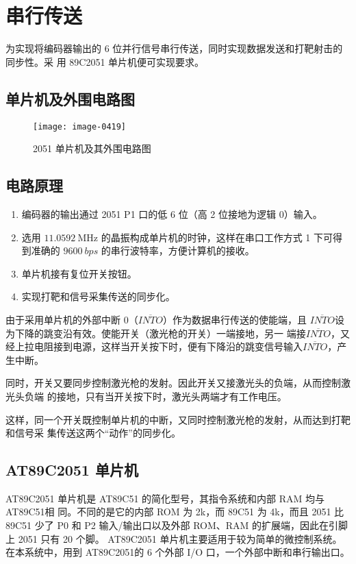 \section{串行传送}

为实现将编码器输出的 6 位并行信号串行传送，同时实现数据发送和打靶射击的同步性。采
用 89C2051 单片机便可实现要求。

\subsection{单片机及外围电路图}

\begin{figure}[htbp]
  \centering
  \texttt{[image: image-0419]}
  \caption{2051 单片机及其外围电路图}\label{4-8}
\end{figure}

\subsection{电路原理}

\begin{enumerate}
  \item 编码器的输出通过 2051 P1 口的低 6 位（高 2 位接地为逻辑 0）输入。
  \item 选用 $\qty{11.0592}\MHz$ 的晶振构成单片机的时钟，这样在串口工作方式 1 下可得到准确的 $\qty{9600}{bps}$ 的串行波特率，方便计算机的接收。
  \item 单片机接有复位开关按钮。
  \item 实现打靶和信号采集传送的同步化。
\end{enumerate}

由于采用单片机的外部中断 0（$\overline{INTO}$）作为数据串行传送的使能端，且
$\overline{INTO}$设为下降的跳变沿有效。使能开关（激光枪的开关）一端接地，另一
端接$\overline{INTO}$，又经上拉电阻接到电源，这样当开关按下时，便有下降沿的跳变信号输入$\overline{INTO}$，产生中断。

同时，开关又要同步控制激光枪的发射。因此开关又接激光头的负端，从而控制激光头负端
的接地，只有当开关按下时，激光头两端才有工作电压。

这样，同一个开关既控制单片机的中断，又同时控制激光枪的发射，从而达到打靶和信号采
集传送这两个“动作”的同步化。

\subsection{AT89C2051 单片机\cite{cn12}}

AT89C2051 单片机是 AT89C51 的简化型号，其指令系统和内部 RAM 均与 AT89C51相
同。不同的是它的内部 ROM 为 2k，而 89C51 为 4k，而且 2051 比 89C51 少了 P0
和 P2 输入/输出口以及外部 ROM、RAM 的扩展端，因此在引脚上 2051 只有 20 个脚。
AT89C2051 单片机主要适用于较为简单的微控制系统。在本系统中，用到 AT89C2051的 
6 个外部 I/O 口，一个外部中断和串行输出口。

